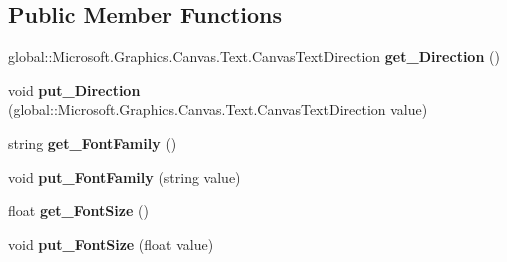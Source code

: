 \subsection*{Public Member Functions}
\begin{DoxyCompactItemize}
\item 
\mbox{\label{interface_microsoft_1_1_graphics_1_1_canvas_1_1_text_1_1_i_canvas_text_format_ad08083df7e2d44e9c7e2515e41680d6c}} 
global\+::\+Microsoft.\+Graphics.\+Canvas.\+Text.\+Canvas\+Text\+Direction {\bfseries get\+\_\+\+Direction} ()
\item 
\mbox{\label{interface_microsoft_1_1_graphics_1_1_canvas_1_1_text_1_1_i_canvas_text_format_ae3d774c44911dc8c0de1180ace93d9a4}} 
void {\bfseries put\+\_\+\+Direction} (global\+::\+Microsoft.\+Graphics.\+Canvas.\+Text.\+Canvas\+Text\+Direction value)
\item 
\mbox{\label{interface_microsoft_1_1_graphics_1_1_canvas_1_1_text_1_1_i_canvas_text_format_a8fe1529664d2dfc46f799ee6b186b187}} 
string {\bfseries get\+\_\+\+Font\+Family} ()
\item 
\mbox{\label{interface_microsoft_1_1_graphics_1_1_canvas_1_1_text_1_1_i_canvas_text_format_a69caecba006870d1082bccc391fe1ffd}} 
void {\bfseries put\+\_\+\+Font\+Family} (string value)
\item 
\mbox{\label{interface_microsoft_1_1_graphics_1_1_canvas_1_1_text_1_1_i_canvas_text_format_a2179dacf6c7f28ebcfd811d8b0b3c56b}} 
float {\bfseries get\+\_\+\+Font\+Size} ()
\item 
\mbox{\label{interface_microsoft_1_1_graphics_1_1_canvas_1_1_text_1_1_i_canvas_text_format_a8362a30e758e319e0a809612f7ae588c}} 
void {\bfseries put\+\_\+\+Font\+Size} (float value)
\item 
\mbox{\label{interface_microsoft_1_1_graphics_1_1_canvas_1_1_text_1_1_i_canvas_text_format_a2d893747a0b7e4f012077b9c30b7a813}} 

\end{DoxyCompactItemize}
